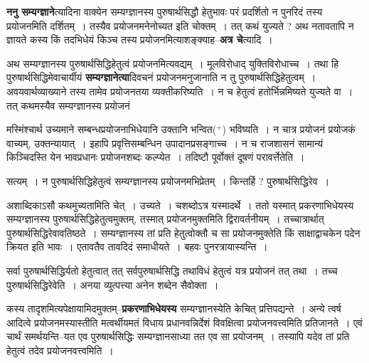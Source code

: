 \documentclass[article,12pt,a4paper]{memoir}
\newcommand{\add}[1]{($^{+}$#1)}
\begin{document}
	  \pstart \textbf{ननु सम्यग्ज्ञाने}त्यादिना वाक्येन सम्यग्ज्ञानस्य पुरुषार्थसिद्धौ हेतुभावः परं प्रदर्शितो न पुनरिदं तस्य प्रयोजनमिति दर्शितम् । तस्यैव प्रयोजनमनेनोच्यत इति चोक्तम् । तत् कथं युज्यते ? अथ नतावतापि न ज्ञायते कस्य किं तदभिधेयं किञ्च तस्य प्रयोजनमित्याशङ्क्याह--\textbf{अत्र चे}त्यादि ।
	\pend
      

	  \pstart अथ सम्यग्ज्ञानस्य पुरुषार्थसिद्धिहेतुत्वं प्रयोजनमित्यवद्यम् । मूलविरोधाद् युक्तिविरोधाच्च । तथा हि पुरुषार्थसिद्धिमेवाचार्यीयं \textbf{सम्यग्ज्ञानेत्या}दिवचनं प्रयोजनमनुजानाति न तु पुरुषार्थसि\leavevmode{}द्धिहेतुत्वम् । अवयवार्थव्याख्याने तस्य तामेव प्रयोजनतया व्यक्तीकरिष्यति । न च हेतुत्वं हतोर्भिन्नमिष्यते युज्यते वा । तत् कथमस्यैव सम्यग्ज्ञानस्य प्रयोजनं  \leavevmode{} 
	  
	मस्मिंश्चार्थ उच्यमाने सम्बन्धप्रयोजनाभिधेयानि उक्तानि भन्वित\add{} भविष्यति । न चात्र प्रयोजनं प्रयोजकं वाच्यम्, उक्तन्यायात् । इहापि प्रवृत्तिसम्बन्धिन उपादानप्रसङ्गाच्च । न च राजशासनं सामान्यं किञ्चिदस्ति येन भावप्रधानः प्रयोजनशब्दः कल्प्येत । तदिष्टौ पूर्वोक्तं दूषणं परावर्त्तेतेति ।
	\pend
      

	  \pstart सत्यम् । न पुरुषार्थसिद्धिहेतुत्वं सम्यग्ज्ञानस्य प्रयोजनमभिप्रेतम् । किन्तर्हि ? पुरुषार्थसिद्धिरेव ।
	\pend
      

	  \pstart अशाब्दिकाऽसौ कथमुच्यतामिति चेत् । उच्यते । चशब्दोऽत्र यस्मादर्थे । ततो यस्मात् प्रकरणाभिधेयस्य सम्यग्ज्ञानस्य पुरुषार्थसिद्धिहेतुत्वमुक्तम्, तस्मात् प्रयोजनमुक्तमिति द्विरावर्तनीयम् । तच्चात्रार्थात् पुरुषार्थसिद्धिरेवावतिष्ठते । सम्यग्ज्ञानस्य तां प्रति हेतुत्वोक्तौ च सा प्रयोजनमुक्तेति किं साक्षाद्वाचकेन पदेन क्रियत इति भावः । एतावतैव तावदिदं समाधीयते । बहवः पुनरत्रायास्यन्ति ।
	\pend
      

	  \pstart सर्वा पुरुषार्थसिद्धिर्यतो हेतुत्वात् तत् सर्वपुरुषार्थसिद्धि तथाविधं हेतुत्वं यत्र प्रयोजनं तत् तथा । तच्च पुरुषार्थसिद्धिरेवेति । अनया व्युत्पत्त्या अनेन शब्देन सैवोक्ता ।
	\pend
      

	  \pstart कस्य तादृशमित्यपेक्षायामिदमुक्तम्--\textbf{प्रकरणाभिधेयस्य} सम्यग्ज्ञानस्येति केचित् प्रत्तिपद्यन्ते । अन्ये त्वर्ष  आदित्वे प्रयोजनमस्यास्तीति मत्वर्थीयमतं विधाय प्रधानवन्निर्देशं विवक्षित्वा प्रयोजनवत्त्वमिति प्रतिजानते । एवं चार्थं समर्थयन्ति--यत एव पुरुषार्थसिद्धिः सम्यग्ज्ञानसाध्या तत एव सा प्रयोजनम् । तस्यापि यदेव तां प्रति हेतुत्वं तदेव प्रयोजनवत्त्वमिति ।
	\pend
      
\end{document}
